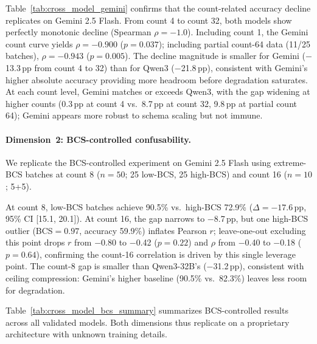 \documentclass[11pt]{article}
\begin{document}
Table~\ref{tab:cross_model_gemini} confirms that the count-related accuracy decline replicates on Gemini 2.5 Flash. From count 4 to count 32, both models show perfectly monotonic decline (Spearman $\rho = -1.0$). Including count 1, the Gemini count curve yields $\rho = -0.900$ ($p = 0.037$); including partial count-64 data (11/25 batches), $\rho = -0.943$ ($p = 0.005$). The decline magnitude is smaller for Gemini ($-$13.3\,pp from count 4 to 32) than for Qwen3 ($-$21.8\,pp), consistent with Gemini's higher absolute accuracy providing more headroom before degradation saturates. At each count level, Gemini matches or exceeds Qwen3, with the gap widening at higher counts (0.3\,pp at count 4 vs.\ 8.7\,pp at count 32, 9.8\,pp at partial count 64); Gemini appears more robust to schema scaling but not immune.

\paragraph{Dimension~2: BCS-controlled confusability.}
We replicate the BCS-controlled experiment on Gemini 2.5 Flash using extreme-BCS batches at count 8 ($n = 50$; 25 low-BCS, 25 high-BCS) and count 16 ($n = 10$; 5+5).

At count 8, low-BCS batches achieve 90.5\% vs.\ high-BCS 72.9\% ($\Delta = -17.6$\,pp, 95\% CI [15.1, 20.1]). At count 16, the gap narrows to $-$8.7\,pp, but one high-BCS outlier (BCS${}=0.97$, accuracy 59.9\%) inflates Pearson $r$; leave-one-out excluding this point drops $r$ from $-$0.80 to $-$0.42 ($p = 0.22$) and $\rho$ from $-$0.40 to $-$0.18 ($p = 0.64$), confirming the count-16 correlation is driven by this single leverage point. The count-8 gap is smaller than Qwen3-32B's ($-$31.2\,pp), consistent with ceiling compression: Gemini's higher baseline (90.5\% vs.\ 82.3\%) leaves less room for degradation.

Table~\ref{tab:cross_model_bcs_summary} summarizes BCS-controlled results across all validated models. Both dimensions thus replicate on a proprietary architecture with unknown training details.
\end{document}
